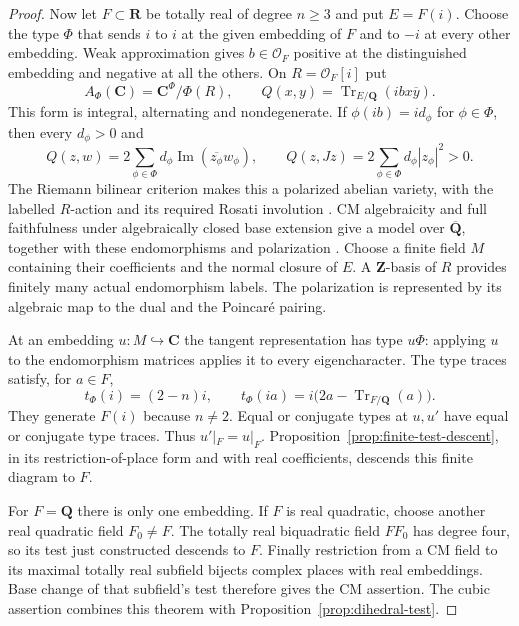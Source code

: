 \documentclass[11pt]{article}
\theoremstyle{definition}\newtheorem{definition}[theorem]{Definition}
\theoremstyle{remark}\newtheorem{remark}[theorem]{Remark}
\newcommand{\Q}{\mathbf Q}\newcommand{\Z}{\mathbf Z}
\newcommand{\R}{\mathbf R}\newcommand{\C}{\mathbf C}
\newcommand{\Qb}{\overline{\mathbf Q}}\newcommand{\Fp}{\mathbf F_p}
\begin{document}
\begin{proof}
Now let $F\subset\R$ be totally real of degree $n\ge3$ and put $E=F(i)$.
Choose the type $\Phi$ that sends $i$ to $i$ at the given embedding of
$F$ and to $-i$ at every other embedding. Weak approximation gives
$b\in\mathcal O_F$ positive at the distinguished embedding and negative
at all the others. On $R=\mathcal O_F[i]$ put
\[
 A_\Phi(\C)=\C^\Phi/\Phi(R),\qquad
 Q(x,y)=\operatorname{Tr}_{E/\Q}(ibx\overline y).
\]
This form is integral, alternating and nondegenerate. If
$\phi(ib)=i d_\phi$ for $\phi\in\Phi$, then every $d_\phi>0$ and
\[
 Q(z,w)=2\sum_{\phi\in\Phi}d_\phi
              \operatorname{Im}(\overline {z_\phi}w_\phi),\qquad
 Q(z,Jz)=2\sum_{\phi\in\Phi}d_\phi|z_\phi|^2>0.
\]
The Riemann bilinear criterion makes this a polarized abelian variety,
with the labelled $R$-action and its required Rosati involution
\cite[Example~2.11, p.~26, and Proposition~3.17, p.~31]{MilneCMNotes}.
CM algebraicity and full faithfulness under algebraically closed base
extension give a model over $\Qb$, together with these endomorphisms and
polarization \cite[Proposition~7.9 and Corollary~7.10, pp.~54--55]{MilneCMNotes}.
Choose a finite field $M$ containing their coefficients and the normal
closure of $E$. A $\Z$-basis of $R$ provides finitely many actual
endomorphism labels. The polarization is represented by its algebraic
map to the dual and the Poincar\'e pairing.

At an embedding $u:M\hookrightarrow\C$ the tangent representation
has type $u\Phi$: applying $u$ to the endomorphism matrices applies it
to every eigencharacter. The type traces satisfy, for $a\in F$,
\[
 t_\Phi(i)=(2-n)i,\qquad
 t_\Phi(ia)=i\bigl(2a-\operatorname{Tr}_{F/\Q}(a)\bigr).
\]
They generate $F(i)$ because $n\ne2$. Equal or conjugate types at
$u,u'$ have equal or conjugate type traces. Thus $u'|_F=u|_F$.
Proposition~\ref{prop:finite-test-descent}, in its restriction-of-place
form and with real coefficients, descends this finite diagram to $F$.

For $F=\Q$ there is only one embedding. If $F$ is real quadratic,
choose another real quadratic field $F_0\ne F$. The totally real
biquadratic field $FF_0$ has degree four, so its test just constructed
descends to $F$. Finally restriction from a CM field to its maximal
totally real subfield bijects complex places with real embeddings.
Base change of that subfield's test therefore gives the CM assertion.
The cubic assertion combines this theorem with
Proposition~\ref{prop:dihedral-test}.
\end{proof}
\end{document}
